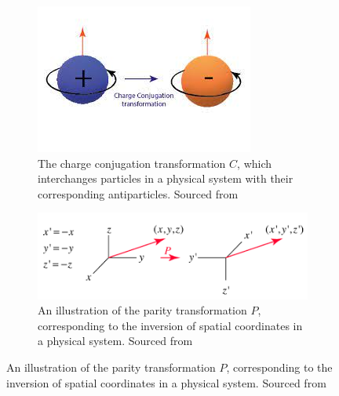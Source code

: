 \begin{figure}[H]
    \centering
    \begin{subfigure}{0.5\textwidth}
        \includegraphics[]{ChargeConjugation.jpg}
        \caption{The charge conjugation transformation $C$, which interchanges particles in a physical system with their corresponding antiparticles. Sourced from \cite{ChargeConj}}
        \label{ChargeConjugation}
    \end{subfigure}
    \hfill
    \begin{subfigure}{0.7\textwidth}
        \includegraphics[]{ParityTransformation.png}
        \caption{An illustration of the parity transformation $P$, corresponding
        to the inversion of spatial coordinates in a physical system. Sourced from \cite{ParityTransf}}
        \label{ParityTransformation}
    \end{subfigure}
    \hfill
\end{figure}
